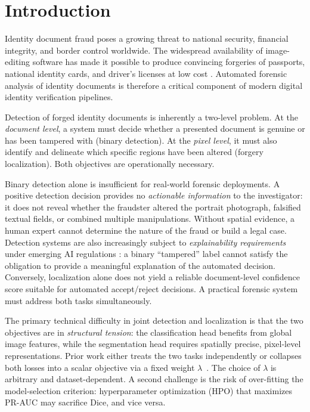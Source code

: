 \documentclass[final,5p,times,twocolumn,number]{elsarticle}
\begin{document}

\section{Introduction}
\label{sec:intro}

Identity document fraud poses a growing threat to national security, financial
integrity, and border control worldwide. The widespread availability of
image-editing software has made it possible to produce convincing forgeries of
passports, national identity cards, and driver's licenses at low cost
\citep{europol2022deepfakes}. Automated forensic analysis of identity documents
is therefore a critical component of modern digital identity verification
pipelines.

Detection of forged identity documents is inherently a two-level problem. At the
\emph{document level}, a system must decide whether a presented document is
genuine or has been tampered with (binary detection). At the \emph{pixel level},
it must also identify and delineate which specific regions have been altered
(forgery localization). Both objectives are operationally necessary.

Binary detection alone is insufficient for real-world forensic deployments.
A positive detection decision provides no \emph{actionable information} to the
investigator: it does not reveal whether the fraudster altered the portrait
photograph, falsified textual fields, or combined multiple manipulations. Without
spatial evidence, a human expert cannot determine the nature of the fraud or
build a legal case. Detection systems are also increasingly subject to
\emph{explainability requirements} under emerging AI regulations
\citep{euaiact2024}: a binary ``tampered'' label cannot satisfy the obligation
to provide a meaningful explanation of the automated decision. Conversely,
localization alone does not yield a reliable document-level confidence score
suitable for automated accept/reject decisions. A practical forensic system must
address both tasks simultaneously.

The primary technical difficulty in joint detection and localization is that the
two objectives are in \emph{structural tension}: the classification head
benefits from global image features, while the segmentation head requires
spatially precise, pixel-level representations. Prior work either treats the
two tasks independently \citep{trufor2023} or collapses both losses into a
scalar objective via a fixed weight $\lambda$~\citep{kendall2018multi}. The choice of $\lambda$ is arbitrary and dataset-dependent.
A second challenge is the risk of over-fitting the model-selection criterion:
hyperparameter optimization (HPO) that maximizes PR-AUC may sacrifice Dice, and vice versa.
\end{document}

